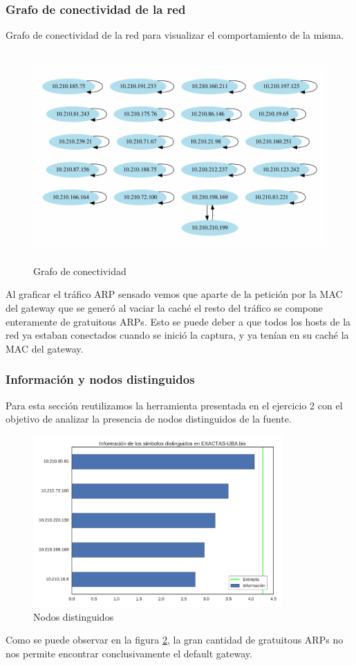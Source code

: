  \subsubsection{Grafo de conectividad de la red}
 Grafo de conectividad de la red para visualizar el comportamiento de la misma.


\begin{figure}[H]
   \centering
       \includegraphics[page=1,height=8cm ,width=1.08\textwidth]{../img/red-EXACTAS-UBA-bis}
 \caption{Grafo de conectividad}
 \label{fig:grafo-exactas}
\end{figure}

Al graficar el tráfico ARP sensado vemos que aparte de la petición por la MAC del gateway que se generó al vaciar la caché el resto del tráfico se compone enteramente de gratuitous ARPs.
Esto se puede deber a que todos los hosts de la red ya estaban conectados cuando se inició la captura, y ya tenían en su caché la MAC del gateway.


\subsubsection{Información y nodos distinguidos}

Para esta sección reutilizamos la herramienta presentada en el ejercicio 2 con el objetivo de analizar la presencia de nodos distinguidos de la fuente. \\

\begin{figure}[H]
    \centering
    \includegraphics[page=1, height=6.55cm ,width=\textwidth]{../img/distinguidos-EXACTAS-UBA-bis}
    \caption{Nodos distinguidos}
    \label{fig:distinguidos-exactas}
\end{figure}

Como se puede observar en la figura \ref{fig:distinguidos-exactas}, la gran cantidad de gratuitous ARPs no nos permite encontrar conclusivamente el default gateway.
